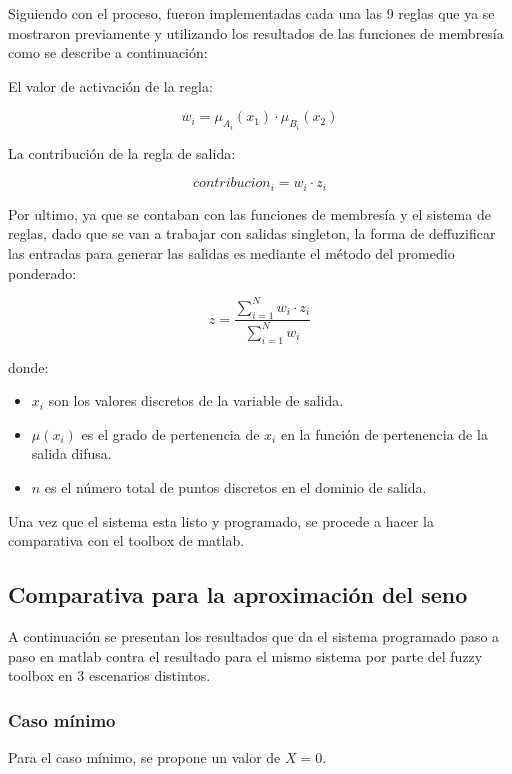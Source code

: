 \documentclass[11pt, letterpaper]{article}
\begin{document}
Siguiendo con el proceso, fueron implementadas cada una las 9 reglas que ya se mostraron previamente y utilizando los resultados de las funciones de membresía como se describe a continuación:

El valor de activación de la regla:

$$
w_i = \mu_{A_i}(x_1) \cdot \mu_{B_i}(x_2)
$$

La contribución de la regla de salida:

$$
contribucion_i = w_i \cdot z_i
$$

\newpage

Por ultimo, ya que se contaban con las funciones de membresía y el sistema de reglas, dado que se van a trabajar con salidas singleton, la forma de deffuzificar las entradas para generar las salidas es mediante el método del promedio ponderado:


$$
z = \frac{\sum_{i=1}^{N} w_i \cdot z_i}{\sum_{i=1}^{N} w_i}
$$


donde:

\begin{itemize}
	\item \( x_i \) son los valores discretos de la variable de salida.
	\item \( \mu(x_i) \) es el grado de pertenencia de \( x_i \) en la función de pertenencia de la salida difusa.
	\item \( n \) es el número total de puntos discretos en el dominio de salida.
\end{itemize}

Una vez que el sistema esta listo y programado, se procede a hacer la comparativa con el toolbox de matlab.

\newpage

\subsection{Comparativa para la aproximación del seno}

A continuación se presentan los resultados que da el sistema programado paso a paso en matlab contra el resultado para el mismo sistema por parte del fuzzy toolbox en 3 escenarios distintos.

\subsubsection{Caso mínimo}

Para el caso mínimo, se propone un valor de $X = 0$.
\end{document}
